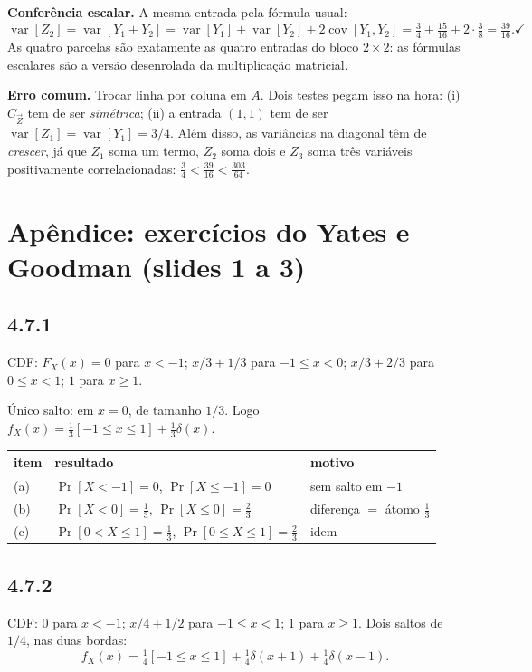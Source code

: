 \documentclass[11pt,a4paper]{article}
\newcommand{\Ind}[1]{\left[#1\right]}
\renewcommand{\Pr}{\operatorname{Pr}}
\DeclareMathOperator{\var}{var}
\DeclareMathOperator{\cov}{cov}
\begin{document}
\textbf{Conferência escalar.} A mesma entrada pela fórmula usual:
\[
\var[Z_2]=\var[Y_1+Y_2]=\var[Y_1]+\var[Y_2]+2\cov[Y_1,Y_2]
=\tfrac34+\tfrac{15}{16}+2\cdot\tfrac38=\tfrac{39}{16}. \checkmark
\]
As quatro parcelas são exatamente as quatro entradas do bloco $2\times2$: as
fórmulas escalares são a versão desenrolada da multiplicação matricial.

\textbf{Erro comum.} Trocar linha por coluna em $A$. Dois testes pegam isso na
hora: (i) $C_{\vec Z}$ tem de ser \emph{simétrica}; (ii) a entrada $(1,1)$ tem de
ser $\var[Z_1]=\var[Y_1]=3/4$. Além disso, as variâncias na diagonal têm de
\emph{crescer}, já que $Z_1$ soma um termo, $Z_2$ soma dois e $Z_3$ soma três
variáveis positivamente correlacionadas: $\tfrac34<\tfrac{39}{16}<\tfrac{303}{64}$.
\checkmark


\clearpage
\appendix
\section{Apêndice: exercícios do Yates e Goodman (slides 1 a 3)}

\subsection*{4.7.1}
CDF: $F_X(x)=0$ para $x<-1$; $x/3+1/3$ para $-1\le x<0$; $x/3+2/3$ para
$0\le x<1$; $1$ para $x\ge1$.

Único salto: em $x=0$, de tamanho $1/3$. Logo
$f_X(x)=\tfrac13\Ind{-1\le x\le 1}+\tfrac13\delta(x)$.

\begin{center}
\begin{tabular}{lll}
\toprule
item & resultado & motivo \\
\midrule
(a) & $\Pr[X<-1]=0$, $\Pr[X\le-1]=0$ & sem salto em $-1$ \\
(b) & $\Pr[X<0]=\tfrac13$, $\Pr[X\le0]=\tfrac23$ & diferença $=$ átomo $\tfrac13$ \\
(c) & $\Pr[0<X\le1]=\tfrac13$, $\Pr[0\le X\le1]=\tfrac23$ & idem \\
\bottomrule
\end{tabular}
\end{center}

\subsection*{4.7.2}
CDF: $0$ para $x<-1$; $x/4+1/2$ para $-1\le x<1$; $1$ para $x\ge1$.
Dois saltos de $1/4$, nas duas bordas:
\[
f_X(x)=\tfrac14\Ind{-1\le x\le1}+\tfrac14\delta(x+1)+\tfrac14\delta(x-1).
\]
\end{document}
